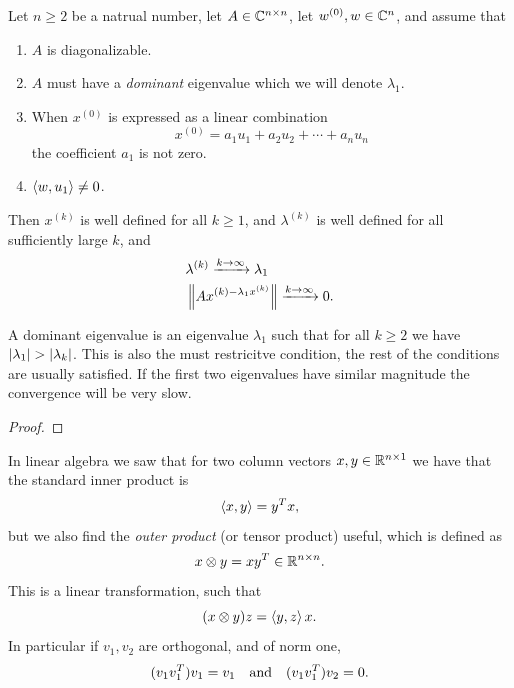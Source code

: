 \documentclass[11pt,a4paper]{article}
\begin{document}
\begin{theorem}
  Let $n \geq 2$ be a natrual number,
  let $A \in \mathbb{C}^{n \times n}$,
  let $w^{(0)}, w \in \mathbb{C}^n$,
  and assume that
  \begin{enumerate}
    \item[(1)] $A$ is diagonalizable.
    \item[(2)] $A$ must have a \textit{dominant} eigenvalue 
      which we will denote $\lambda_1$.
    \item[(3)] When $x^{(0)}$ is expressed as a linear combination
      \[
        x^{(0)} = a_1 u_1 + a_2 u_2 + \cdots + a_n u_n
      \]
      the coefficient $a_1$ is not zero.
    \item[(4)] $\left\langle w, u_1 \right\rangle \neq 0$.
  \end{enumerate}
  Then $x^{(k)}$ is well defined for all $k \geq 1$,
  and $\lambda^{(k)}$ is well defined for all sufficiently large $k$,
  and
  \begin{align*}
    &\lambda^{(k)} \xrightarrow{k \to \infty} \lambda_1 \\
    &\left\lVert A x^{(k) - \lambda_1 x^{(k)}}\right\rVert \xrightarrow{k \to \infty} 0.
  \end{align*}
\end{theorem}
\begin{remark}
  A dominant eigenvalue is an eigenvalue $\lambda_1$ such that for
  all $k \geq 2$ we have $\left\lvert\lambda_1\right\rvert > \left\lvert\lambda_k\right\rvert$.
  This is also the must restricitve condition,
  the rest of the conditions are usually satisfied.
  If the first two eigenvalues have similar magnitude the convergence
  will be very slow.
\end{remark}
\begin{proof}
\end{proof}

\begin{remark}
  In linear algebra we saw that for two column vectors
  $x,y \in \mathbb{R}^{n \times 1}$ we have that the standard inner product
  is
  \[
    \left\langle x, y \right\rangle = y^T x,
  \]
  but we also find the \textit{outer product} (or tensor product) useful,
  which is defined as
  \[
    x \otimes y = x y^T \in \mathbb{R}^{n \times n}. 
  \]
  This is a linear transformation, such that
  \[
    (x \otimes y) z = \left\langle y, z \right\rangle x.
  \]
  In particular if $v_1, v_2$ are orthogonal, and of norm one,
  \[
    (v_1 v_1^T) v_1 = v_1
    \quad \text{and} \quad
    (v_1 v_1^T) v_2 = 0.
  \]
\end{remark}
\end{document}
